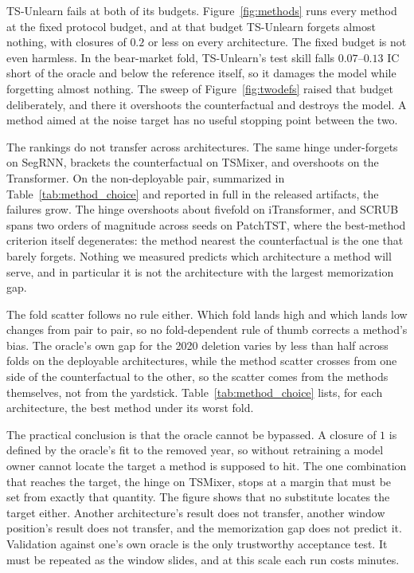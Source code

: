 TS-Unlearn fails at both of its budgets. Figure~\ref{fig:methods}
runs every method at the fixed protocol budget, and at that budget
TS-Unlearn forgets almost nothing, with
closures of $0.2$ or less on every architecture. The fixed budget
is not even harmless. In the bear-market fold, TS-Unlearn's test
skill falls $0.07$--$0.13$ IC short of the oracle and below the
reference itself, so it damages the model while forgetting almost
nothing. The sweep of
Figure~\ref{fig:twodefs} raised that budget deliberately, and there
it overshoots the counterfactual and destroys the model. A method
aimed at the noise target has no useful stopping point between the
two.

The rankings do not transfer across architectures. The same hinge
under-forgets on SegRNN, brackets the counterfactual on TSMixer,
and overshoots on the Transformer. On the non-deployable pair,
summarized in Table~\ref{tab:method_choice} and reported in full in
the released artifacts, the failures grow. The hinge
overshoots about fivefold on iTransformer, and SCRUB spans two
orders of magnitude across seeds on PatchTST, where the best-method
criterion itself degenerates: the method nearest the counterfactual
is the one that barely forgets. Nothing we measured
predicts which architecture a method will serve, and in particular
it is not the architecture with the largest memorization gap.

The fold scatter follows no rule either. Which fold lands high and
which lands low changes from pair to pair, so no fold-dependent
rule of thumb corrects a method's bias. The oracle's own gap for
the 2020 deletion varies by less than half across folds on the
deployable architectures, while the method scatter crosses from one
side of the counterfactual to the other, so the scatter comes from
the methods themselves, not from the yardstick.
Table~\ref{tab:method_choice} lists, for each architecture, the
best method under its worst fold.

The practical conclusion is that the oracle cannot be bypassed. A
closure of $1$ is defined by the oracle's fit to the removed year,
so without retraining a model owner cannot locate the target a
method is supposed to hit. The one combination that reaches the
target, the hinge on TSMixer, stops at a margin that must be set
from exactly that quantity. The figure shows that no substitute
locates the target either. Another architecture's result does not
transfer, another window position's result does not transfer, and
the memorization gap does not predict it. Validation against one's
own oracle is the only trustworthy acceptance test. It must be
repeated as the window slides, and at this scale each run costs
minutes.

